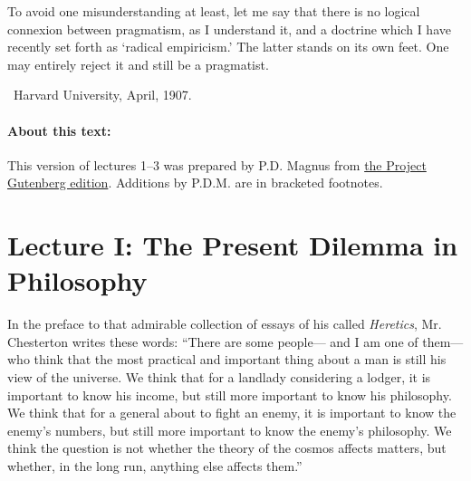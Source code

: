 \documentclass[]{article}
\begin{document}


To avoid one misunderstanding at least, let me say that there is no logical connexion between pragmatism, as I understand it, and a doctrine
which I have recently set forth as `radical empiricism.' The latter
stands on its own feet. One may entirely reject it and still be a
pragmatist.

~\hfill Harvard University, April, 1907.

\paragraph{About this text:} This version of lectures 1--3 was prepared by P.D. Magnus from \href{http://www.gutenberg.org/ebooks/5116}{the Project Gutenberg edition}. Additions by P.D.M. are in bracketed footnotes.

\section*{Lecture I: The Present Dilemma in Philosophy}

In the preface to that admirable collection of essays of his called
\emph{Heretics}, Mr. Chesterton writes these words: ``There are some
people--- and I am one of them--- who think that the most practical and
important thing about a man is still his view of the universe. We think
that for a landlady considering a lodger, it is important to know his
income, but still more important to know his philosophy. We think that
for a general about to fight an enemy, it is important to know
the enemy's numbers, but still more important to know the enemy's
philosophy. We think the question is not whether the theory of the
cosmos affects matters, but whether, in the long run, anything else
affects them.''
\end{document}
